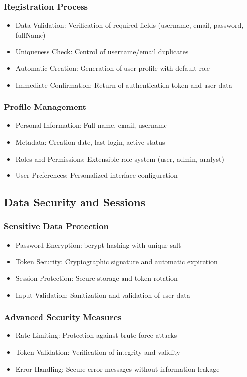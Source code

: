 \subsubsection{Registration Process}
\begin{itemize}
    \item Data Validation: Verification of required fields (username, email, password, fullName)
    \item Uniqueness Check: Control of username/email duplicates
    \item Automatic Creation: Generation of user profile with default role
    \item Immediate Confirmation: Return of authentication token and user data
\end{itemize}

\subsubsection{Profile Management}
\begin{itemize}
    \item Personal Information: Full name, email, username
    \item Metadata: Creation date, last login, active status
    \item Roles and Permissions: Extensible role system (user, admin, analyst)
    \item User Preferences: Personalized interface configuration
\end{itemize}

\subsection{Data Security and Sessions}
\subsubsection{Sensitive Data Protection}
\begin{itemize}
    \item Password Encryption: bcrypt hashing with unique salt
    \item Token Security: Cryptographic signature and automatic expiration
    \item Session Protection: Secure storage and token rotation
    \item Input Validation: Sanitization and validation of user data
\end{itemize}

\subsubsection{Advanced Security Measures}
\begin{itemize}
    \item Rate Limiting: Protection against brute force attacks
    \item Token Validation: Verification of integrity and validity
    \item Error Handling: Secure error messages without information leakage
    
\end{itemize}


